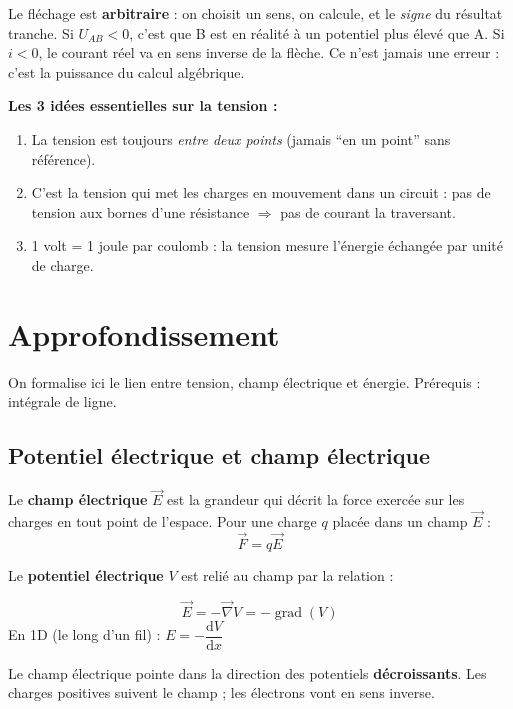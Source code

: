 \documentclass[12pt,a4paper,twoside]{book}
\begin{document}
\begin{attention}
Le fléchage est \textbf{arbitraire} : on choisit un sens, on calcule, et le \textit{signe} du résultat tranche. Si $U_{AB} < 0$, c'est que B est en réalité à un potentiel plus élevé que A. Si $i < 0$, le courant réel va en sens inverse de la flèche. Ce n'est jamais une erreur : c'est la puissance du calcul algébrique.
\end{attention}

\begin{retenir}
\textbf{Les 3 idées essentielles sur la tension :}
\begin{enumerate}[nosep]
\item La tension est toujours \textit{entre deux points} (jamais ``en un point'' sans référence).
\item C'est la tension qui met les charges en mouvement dans un circuit : pas de tension aux bornes d'une résistance $\Rightarrow$ pas de courant la traversant.
\item 1 volt = 1 joule par coulomb : la tension mesure l'énergie échangée par unité de charge.
\end{enumerate}
\end{retenir}

\section{Approfondissement}

\begin{approfondissement}
On formalise ici le lien entre tension, champ électrique et énergie. Prérequis : intégrale de ligne.
\end{approfondissement}

\subsection{Potentiel électrique et champ électrique}

Le \textbf{champ électrique} $\vec{E}$ est la grandeur qui décrit la force exercée sur les charges en tout point de l'espace. Pour une charge $q$ placée dans un champ $\vec{E}$ :
\[
\vec{F} = q\vec{E}
\]

Le \textbf{potentiel électrique} $V$ est relié au champ par la relation :

\begin{formule}
\[
\boxed{\vec{E} = -\vec{\nabla}V = -\operatorname{grad}(V)}
\]
En 1D (le long d'un fil) : $E = -\dfrac{\mathrm{d}V}{\mathrm{d}x}$

\vspace{0.2cm}

Le champ électrique pointe dans la direction des potentiels \textbf{décroissants}. Les charges positives suivent le champ ; les électrons vont en sens inverse.
\end{formule}
\end{document}
